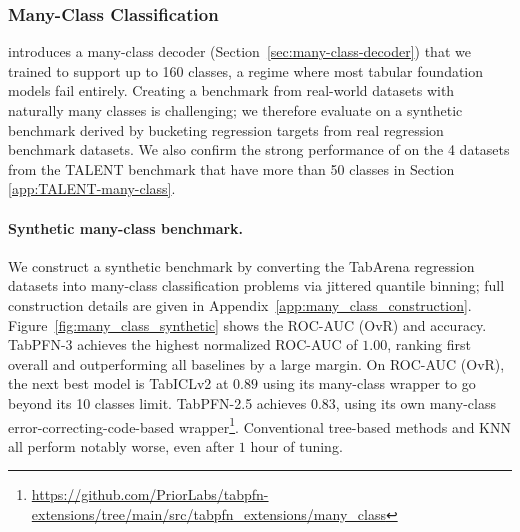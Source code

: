 \subsubsection{Many-Class Classification}
\label{sec:many-class-eval}

\ourmodel introduces a many-class decoder (Section~\ref{sec:many-class-decoder}) that we trained to support up to 160 classes, a regime where most tabular foundation models fail entirely. Creating a benchmark from real-world datasets with naturally many classes is challenging; we therefore evaluate on a synthetic benchmark derived by bucketing regression targets from real regression benchmark datasets. We also confirm the strong performance of \ourmodel on the 4 datasets from the TALENT benchmark that have more than 50 classes in Section \ref{app:TALENT-many-class}.

\paragraph{Synthetic many-class benchmark.}
We construct
a synthetic benchmark by converting the TabArena regression datasets into many-class
classification problems via jittered quantile binning; full construction details
are given in Appendix~\ref{app:many_class_construction}.
Figure~\ref{fig:many_class_synthetic} shows the ROC-AUC (OvR) and accuracy.
TabPFN-3 achieves the highest normalized ROC-AUC of $1.00$, ranking first overall and outperforming all baselines by a large margin.
On ROC-AUC (OvR), the next best model is TabICLv2 at $0.89$ using its many-class wrapper to go beyond its 10 classes limit. TabPFN-2.5 achieves $0.83$, using its own many-class error-correcting-code-based wrapper\footnote{\url{https://github.com/PriorLabs/tabpfn-extensions/tree/main/src/tabpfn_extensions/many_class}}.
Conventional tree-based methods and KNN all perform notably worse, even after $1$ hour of tuning.


